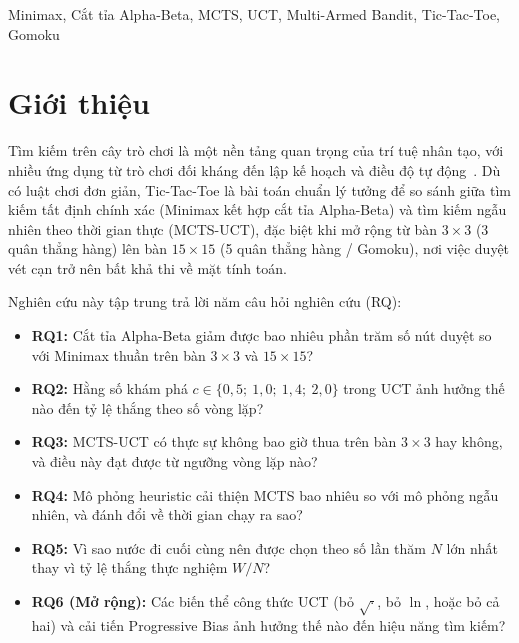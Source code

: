 \documentclass[conference]{IEEEtran}
\begin{document}
\begin{IEEEkeywords}
Minimax, Cắt tỉa Alpha-Beta, MCTS, UCT, Multi-Armed Bandit, Tic-Tac-Toe, Gomoku
\end{IEEEkeywords}

\section{Giới thiệu}
Tìm kiếm trên cây trò chơi là một nền tảng quan trọng của trí tuệ nhân tạo, với nhiều ứng dụng từ trò chơi đối kháng đến lập kế hoạch và điều độ tự động~\cite{russell2020}. Dù có luật chơi đơn giản, Tic-Tac-Toe là bài toán chuẩn lý tưởng để so sánh giữa tìm kiếm tất định chính xác (Minimax kết hợp cắt tỉa Alpha-Beta) và tìm kiếm ngẫu nhiên theo thời gian thực (MCTS-UCT), đặc biệt khi mở rộng từ bàn $3\times 3$ (3 quân thẳng hàng) lên bàn $15\times 15$ (5 quân thẳng hàng / Gomoku), nơi việc duyệt vét cạn trở nên bất khả thi về mặt tính toán.

Nghiên cứu này tập trung trả lời năm câu hỏi nghiên cứu (RQ):
\begin{itemize}
    \item \textbf{RQ1:} Cắt tỉa Alpha-Beta giảm được bao nhiêu phần trăm số nút duyệt so với Minimax thuần trên bàn $3\times 3$ và $15\times 15$?
    \item \textbf{RQ2:} Hằng số khám phá $c \in \{0{,}5;\ 1{,}0;\ 1{,}4;\ 2{,}0\}$ trong UCT ảnh hưởng thế nào đến tỷ lệ thắng theo số vòng lặp?
    \item \textbf{RQ3:} MCTS-UCT có thực sự không bao giờ thua trên bàn $3\times 3$ hay không, và điều này đạt được từ ngưỡng vòng lặp nào?
    \item \textbf{RQ4:} Mô phỏng heuristic cải thiện MCTS bao nhiêu so với mô phỏng ngẫu nhiên, và đánh đổi về thời gian chạy ra sao?
    \item \textbf{RQ5:} Vì sao nước đi cuối cùng nên được chọn theo số lần thăm $N$ lớn nhất thay vì tỷ lệ thắng thực nghiệm $W/N$?
    \item \textbf{RQ6 (Mở rộng):} Các biến thể công thức UCT (bỏ $\sqrt{\cdot}$, bỏ $\ln$, hoặc bỏ cả hai) và cải tiến Progressive Bias ảnh hưởng thế nào đến hiệu năng tìm kiếm?
\end{itemize}
\end{document}
